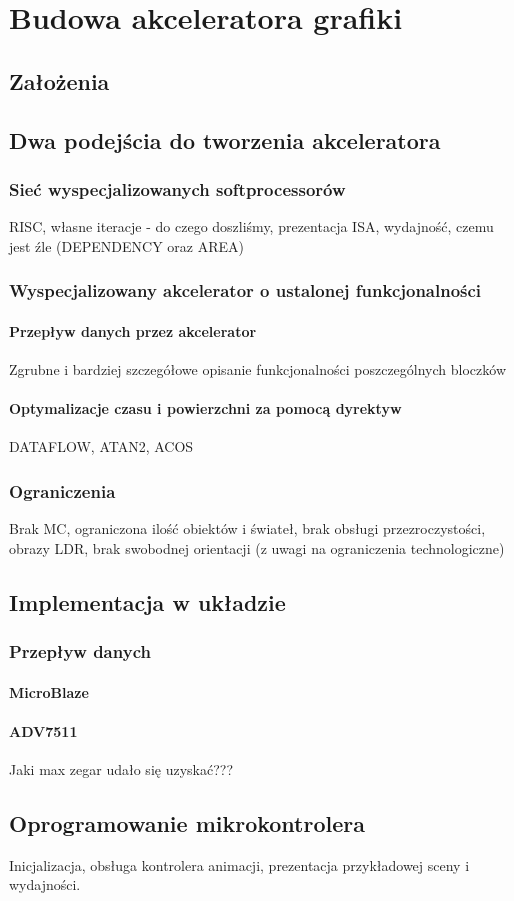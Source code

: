 \chapter{Budowa akceleratora grafiki}
\section{Założenia}

\section{Dwa podejścia do tworzenia akceleratora}
\subsection{Sieć wyspecjalizowanych softprocessorów}
RISC, własne iteracje - do czego doszliśmy, prezentacja ISA, wydajność, czemu jest źle (DEPENDENCY oraz AREA)
\subsection{Wyspecjalizowany akcelerator o ustalonej funkcjonalności}
\subsubsection{Przepływ danych przez akcelerator}
Zgrubne i bardziej szczegółowe opisanie funkcjonalności poszczególnych bloczków
\subsubsection{Optymalizacje czasu i powierzchni za pomocą dyrektyw}
DATAFLOW, ATAN2, ACOS

\subsection{Ograniczenia}
Brak MC, ograniczona ilość obiektów i świateł, brak obsługi przezroczystości, obrazy LDR, brak swobodnej orientacji (z uwagi na ograniczenia technologiczne)

\section{Implementacja w układzie}
\subsection{Przepływ danych}
\subsubsection{MicroBlaze}
\subsubsection{ADV7511}
Jaki max zegar udało się uzyskać???

\section{Oprogramowanie mikrokontrolera}
Inicjalizacja, obsługa kontrolera animacji, prezentacja przykładowej sceny i wydajności.